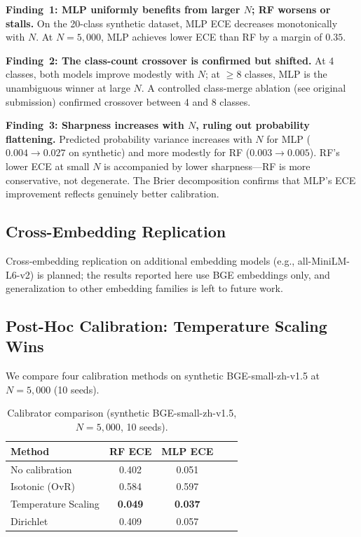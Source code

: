 \documentclass[11pt]{article}
\begin{document}
\textbf{Finding~1: MLP uniformly benefits from larger $N$; RF worsens or stalls.} On the 20-class synthetic dataset, MLP ECE decreases monotonically with $N$. At $N{=}5{,}000$, MLP achieves lower ECE than RF by a margin of $0.35$.

\textbf{Finding~2: The class-count crossover is confirmed but shifted.} At 4 classes, both models improve modestly with $N$; at $\geq 8$ classes, MLP is the unambiguous winner at large $N$. A controlled class-merge ablation (see original submission) confirmed crossover between 4 and 8 classes.

\textbf{Finding~3: Sharpness increases with $N$, ruling out probability flattening.} Predicted probability variance increases with $N$ for MLP ($0.004 \to 0.027$ on synthetic) and more modestly for RF ($0.003 \to 0.005$). RF's lower ECE at small $N$ is accompanied by lower sharpness---RF is more conservative, not degenerate. The Brier decomposition confirms that MLP's ECE improvement reflects genuinely better calibration.

\subsection{Cross-Embedding Replication}
\label{sec:cross_embedding}

Cross-embedding replication on additional embedding models (e.g., all-MiniLM-L6-v2) is planned; the results reported here use BGE embeddings only, and generalization to other embedding families is left to future work.

\subsection{Post-Hoc Calibration: Temperature Scaling Wins}

We compare four calibration methods on synthetic BGE-small-zh-v1.5 at $N{=}5{,}000$ (10 seeds).

\begin{table}[t]
\centering
\caption{Calibrator comparison (synthetic BGE-small-zh-v1.5, $N{=}5{,}000$, 10 seeds).}
\label{tab:calibrators}
\begin{tabular}{@{}lcccc@{}}
\toprule
\textbf{Method} & \textbf{RF ECE} & \textbf{MLP ECE} \\
\midrule
No calibration   & 0.402 & 0.051 \\
Isotonic (OvR)   & 0.584 & 0.597 \\
Temperature Scaling & \textbf{0.049} & \textbf{0.037} \\
Dirichlet        & 0.409 & 0.057 \\
\bottomrule
\end{tabular}
\end{table}
\end{document}
